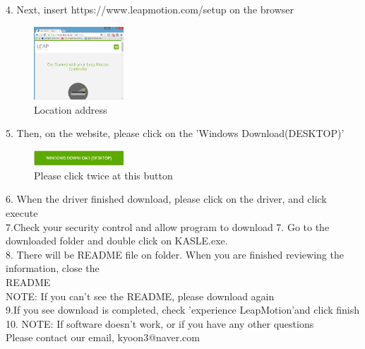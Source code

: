 \documentclass[10pt,journal,compsoc]{IEEEtran}
\begin{document}
4. Next, insert https://www.leapmotion.com/setup  on the browser\\
\begin{figure}[H]
\centering
\includegraphics[width=0.3\textwidth]{address.png}
{\caption*{Location address}}
\end{figure}

5. Then, on the website, please click on the 'Windows Download(DESKTOP)'\\

\begin{figure}[H]
\centering
\includegraphics[width=0.3\textwidth]{Download.png}
{\caption*{Please click  twice at this button}}
\end{figure}
6. When the driver finished download, please click on the driver, and click execute\\
7.Check your security control and allow program to download
7. Go to the downloaded folder and double click on KASLE.exe. \\
8. There will be README file on folder. When you are finished reviewing the information, close the\\
README\\
NOTE: If you can't see the README, please download again\\
9.If you see download is completed, check 'experience LeapMotion'and click finish \\
10.
NOTE: If software doesn't work, or if you have any other questions \\
Please contact our email, kyoon3@naver.com\\
\end{document}
